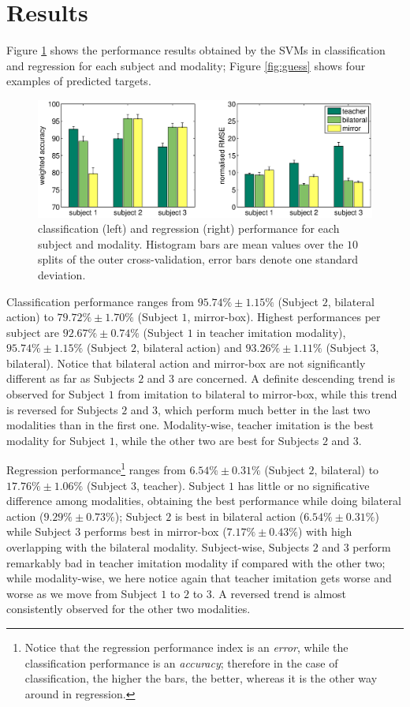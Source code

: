 \section{Results}
\label{sec:exp}

Figure \ref{fig:results} shows the performance results obtained by the SVMs
in classification and regression for each subject and modality; Figure
\ref{fig:guess} shows four examples of predicted targets.

\begin{figure}[!ht] \centering
  \includegraphics[width=\textwidth]{figs/figPerf}
  \caption{classification (left) and regression (right) performance
    for each subject and modality. Histogram bars are mean values over
    the $10$ splits of the outer cross-validation, error bars denote one
    standard deviation.}
  \label{fig:results}
\end{figure}

Classification performance ranges from $95.74\% \pm 1.15\%$ (Subject $2$,
bilateral action) to $79.72\% \pm 1.70\%$ (Subject $1$, mirror-box). Highest
performances per subject are $92.67\% \pm 0.74\%$ (Subject $1$ in teacher
imitation modality), $95.74\% \pm 1.15\%$ (Subject $2$, bilateral action)
and $93.26\% \pm 1.11\%$ (Subject $3$, bilateral). Notice that
bilateral action and mirror-box are not significantly different as far as
Subjects $2$ and $3$ are concerned. A definite descending trend is observed
for Subject $1$ from imitation to bilateral to mirror-box, while this trend
is reversed for Subjects $2$ and $3$, which perform much better in the last
two modalities than in the first one. Modality-wise, teacher imitation is
the best modality for Subject $1$, while the other two are best for Subjects
$2$ and $3$.

Regression performance\footnote{Notice that the regression performance index
is an \emph{error}, while the classification performance is an \emph{accuracy};
therefore in the case of classification, the higher the bars, the better, whereas
it is the other way around in regression.} ranges from $6.54\% \pm 0.31\%$ (Subject $2$,
bilateral) to $17.76\% \pm 1.06\%$ (Subject $3$, teacher). Subject $1$ has
little or no significative difference among modalities, obtaining the best
performance while doing bilateral action ($9.29\% \pm 0.73\%$); Subject $2$
is best in bilateral action ($6.54\% \pm 0.31\%$) while Subject $3$ performs
best in mirror-box ($7.17\% \pm 0.43\%$) with high overlapping with the bilateral
modality. Subject-wise, Subjects $2$ and $3$ perform remarkably bad in teacher
imitation modality if compared with the other two; while modality-wise, we here
notice again that teacher imitation gets worse and worse as we move from Subject
$1$ to $2$ to $3$. A reversed trend is almost consistently observed for the other
two modalities.

